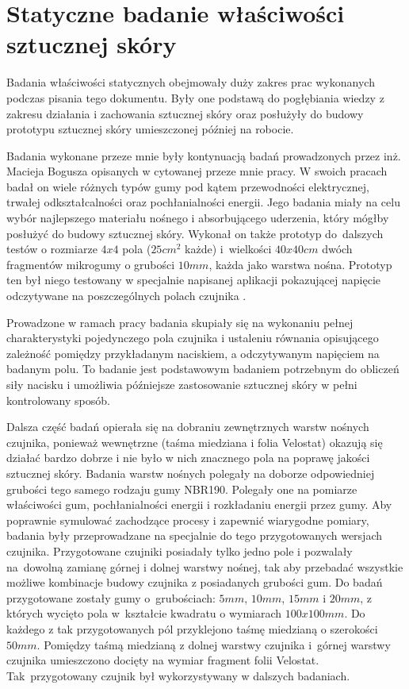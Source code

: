 \newpage
\section{Statyczne badanie właściwości sztucznej skóry}
\label{s_badanie}

Badania właściwości statycznych obejmowały duży zakres prac wykonanych podczas pisania tego dokumentu. Były one podstawą do pogłębiania wiedzy z zakresu działania i zachowania sztucznej skóry oraz posłużyły do budowy prototypu sztucznej skóry umieszczonej później na robocie. 

Badania wykonane przeze mnie były kontynuacją badań prowadzonych przez inż. Macieja Bogusza opisanych w cytowanej przeze mnie pracy. W swoich pracach badał on wiele różnych typów gumy pod kątem przewodności elektrycznej, trwałej odkształcalności oraz pochłanialności energii. Jego badania miały na celu wybór najlepszego materiału nośnego i absorbującego uderzenia, który mógłby posłużyć do budowy sztucznej skóry. Wykonał on także prototyp do~dalszych testów o rozmiarze $4x4$ pola ($25 cm^2$ każde) i~wielkości $40x40 cm$ dwóch fragmentów mikrogumy o grubości $10mm$, każda jako warstwa nośna. Prototyp ten był niego testowany w specjalnie napisanej aplikacji pokazującej napięcie odczytywane na poszczególnych polach czujnika 
\cite{b_report_otrzymane}.

Prowadzone w ramach pracy badania skupiały się na wykonaniu pełnej charakterystyki pojedynczego pola czujnika i ustaleniu równania opisującego zależność pomiędzy przykładanym naciskiem, a odczytywanym napięciem na badanym polu. To badanie jest podstawowym badaniem potrzebnym do obliczeń siły nacisku i umożliwia późniejsze zastosowanie sztucznej skóry w pełni kontrolowany sposób.

Dalsza część badań opierała się na dobraniu zewnętrznych warstw nośnych czujnika, ponieważ wewnętrzne (taśma miedziana i folia Velostat) okazują się działać bardzo dobrze i nie było w nich znacznego pola na poprawę jakości sztucznej skóry. Badania warstw nośnych polegały na doborze odpowiedniej grubości tego samego rodzaju gumy NBR190. Polegały one na pomiarze właściwości gum, pochłanialności energii i rozkładaniu energii przez gumy. Aby poprawnie symulować zachodzące procesy i zapewnić wiarygodne pomiary, badania były przeprowadzane na specjalnie do tego przygotowanych wersjach czujnika. Przygotowane czujniki posiadały tylko jedno pole i pozwalały na~dowolną zamianę górnej i dolnej warstwy nośnej, tak aby przebadać wszystkie możliwe kombinacje budowy czujnika z posiadanych grubości gum. Do badań przygotowane zostały gumy o~grubościach: $5mm$, $10mm$, $15mm$ i $20mm$, z których wycięto pola w~kształcie kwadratu o wymiarach $100x100 mm$. Do każdego z tak przygotowanych pól przyklejono taśmę miedzianą o szerokości $50 mm$. Pomiędzy taśmą miedzianą z dolnej warstwy czujnika i~górnej warstwy czujnika umieszczono docięty na wymiar fragment folii Velostat. Tak~przygotowany czujnik był wykorzystywany w dalszych badaniach.

